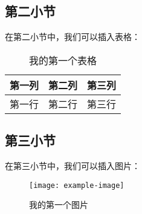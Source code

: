 \documentclass[UTF8]{ctexart}
\begin{document}
\subsection{第二小节}

在第二小节中，我们可以插入表格：

\begin{table}[htbp]
\centering
\begin{tabular}{|c|c|c|}
\hline
第一列 & 第二列 & 第三列 \\
\hline
第一行 & 第二行 & 第三行 \\
\hline
\end{tabular}
\caption{我的第一个表格}
\end{table}

\subsection{第三小节}

在第三小节中，我们可以插入图片：

\begin{figure}[htbp]
\centering
\texttt{[image: example-image]}
\caption{我的第一个图片}
\end{figure}



\end{document}
